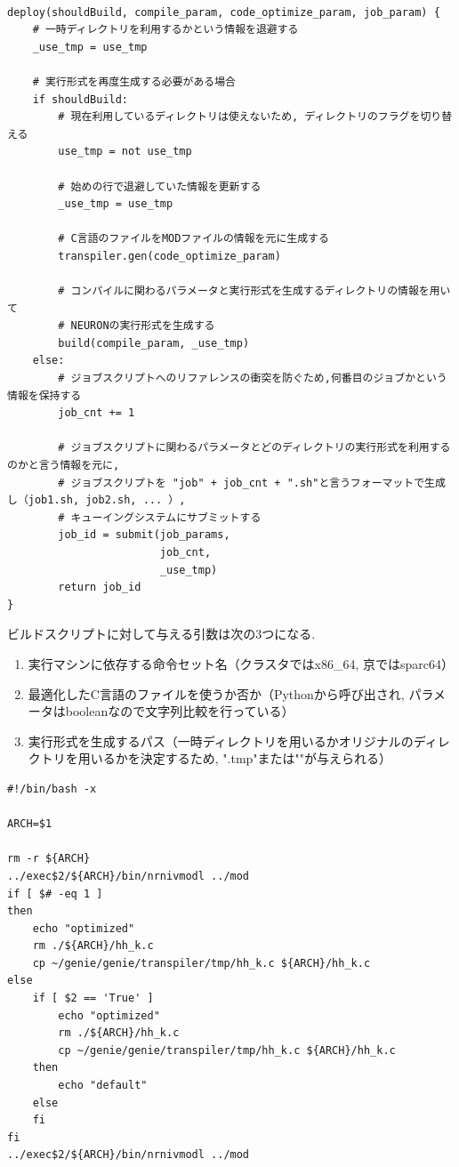 {\footnotesize
\begin{lstlisting}[numbers=none, caption=パラメータ候補群に対するシミュレーション3　疑似コード]

deploy(shouldBuild, compile_param, code_optimize_param, job_param) {
    # 一時ディレクトリを利用するかという情報を退避する
    _use_tmp = use_tmp

    # 実行形式を再度生成する必要がある場合
    if shouldBuild:
        # 現在利用しているディレクトリは使えないため, ディレクトリのフラグを切り替える
        use_tmp = not use_tmp

        # 始めの行で退避していた情報を更新する
        _use_tmp = use_tmp

        # C言語のファイルをMODファイルの情報を元に生成する
        transpiler.gen(code_optimize_param)

        # コンパイルに関わるパラメータと実行形式を生成するディレクトリの情報を用いて
        # NEURONの実行形式を生成する
        build(compile_param, _use_tmp)
    else:
        # ジョブスクリプトへのリファレンスの衝突を防ぐため,何番目のジョブかという情報を保持する
        job_cnt += 1

        # ジョブスクリプトに関わるパラメータとどのディレクトリの実行形式を利用するのかと言う情報を元に,
        # ジョブスクリプトを "job" + job_cnt + ".sh"と言うフォーマットで生成し（job1.sh, job2.sh, ... ）,
        # キューイングシステムにサブミットする
        job_id = submit(job_params,
                        job_cnt,
                        _use_tmp)
        return job_id
}
\end{lstlisting}
}

ビルドスクリプトに対して与える引数は次の3つになる.\\
\begin{enumerate}
\item 実行マシンに依存する命令セット名（クラスタではx86\_64, 京ではsparc64）
\item 最適化したC言語のファイルを使うか否か（Pythonから呼び出され, パラメータはbooleanなので文字列比較を行っている）
\item 実行形式を生成するパス（一時ディレクトリを用いるかオリジナルのディレクトリを用いるかを決定するため, ".tmp"または""が与えられる）
\end{enumerate}
{\footnotesize
\begin{lstlisting}[numbers=none, caption=実行形式のビルドスクリプト]
#!/bin/bash -x

ARCH=$1

rm -r ${ARCH}
../exec$2/${ARCH}/bin/nrnivmodl ../mod
if [ $# -eq 1 ]
then
    echo "optimized"
    rm ./${ARCH}/hh_k.c
    cp ~/genie/genie/transpiler/tmp/hh_k.c ${ARCH}/hh_k.c
else
    if [ $2 == 'True' ]
        echo "optimized"
        rm ./${ARCH}/hh_k.c
        cp ~/genie/genie/transpiler/tmp/hh_k.c ${ARCH}/hh_k.c
    then
        echo "default"
    else
    fi
fi
../exec$2/${ARCH}/bin/nrnivmodl ../mod
\end{lstlisting}
}


